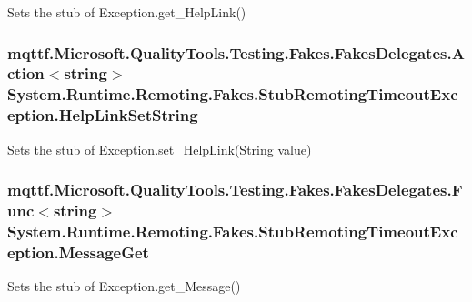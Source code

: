 Sets the stub of Exception.\-get\-\_\-\-Help\-Link()

\hypertarget{class_system_1_1_runtime_1_1_remoting_1_1_fakes_1_1_stub_remoting_timeout_exception_a8caa590ba4a4b33c64387cfa729b986c}{
\subsubsection[{Help\-Link\-Set\-String}]{\setlength{\rightskip}{0pt plus 5cm}mqttf.\-Microsoft.\-Quality\-Tools.\-Testing.\-Fakes.\-Fakes\-Delegates.\-Action$<$string$>$ System.\-Runtime.\-Remoting.\-Fakes.\-Stub\-Remoting\-Timeout\-Exception.\-Help\-Link\-Set\-String}}\label{class_system_1_1_runtime_1_1_remoting_1_1_fakes_1_1_stub_remoting_timeout_exception_a8caa590ba4a4b33c64387cfa729b986c}


Sets the stub of Exception.\-set\-\_\-\-Help\-Link(\-String value)

\hypertarget{class_system_1_1_runtime_1_1_remoting_1_1_fakes_1_1_stub_remoting_timeout_exception_a0e48b210bf22a2cd21263d6317a4029f}{
\subsubsection[{Message\-Get}]{\setlength{\rightskip}{0pt plus 5cm}mqttf.\-Microsoft.\-Quality\-Tools.\-Testing.\-Fakes.\-Fakes\-Delegates.\-Func$<$string$>$ System.\-Runtime.\-Remoting.\-Fakes.\-Stub\-Remoting\-Timeout\-Exception.\-Message\-Get}}\label{class_system_1_1_runtime_1_1_remoting_1_1_fakes_1_1_stub_remoting_timeout_exception_a0e48b210bf22a2cd21263d6317a4029f}


Sets the stub of Exception.\-get\-\_\-\-Message()

